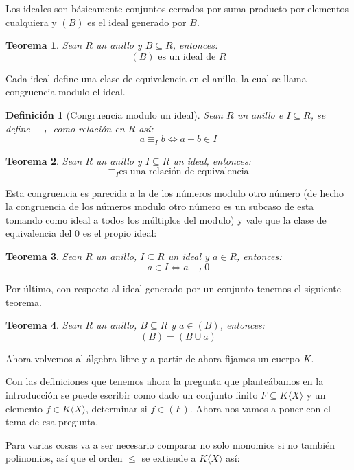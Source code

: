 \documentclass{report}
\theoremstyle{customstyle}
\newtheorem{definition}{Definición}[chapter]
\newtheorem{theorem}{Teorema}[chapter]
\theoremstyle{factstyle}
\begin{document}
Los ideales son básicamente conjuntos cerrados por suma producto por elementos cualquiera y $(B)$ es el ideal generado por $B$.

\begin{theorem}
  Sean $R$ un anillo y $B ⊆ R$, entonces:
  \[ (B)\text{ es un ideal de }R \]
\end{theorem}

Cada ideal define una clase de equivalencia en el anillo, la cual se llama congruencia modulo el ideal.

\begin{definition}[Congruencia modulo un ideal]\label{def:congruencia mod ideal}
  Sean $R$ un anillo e $I ⊆ R$, se define $≡_I$ como relación en $R$ así:
  \[ a ≡_I b ⇔ a - b ∈ I \]
\end{definition}

\begin{theorem}\label{thm:congruencia mod ideal es equivalencia}
  Sean $R$ un anillo y $I ⊆ R$ un ideal, entonces:
  \[ ≡_I \text{es una relación de equivalencia} \]
\end{theorem}

Esta congruencia es parecida a la de los números modulo otro número (de hecho la congruencia de los números modulo otro número es un subcaso de esta tomando como ideal a todos los múltiplos del modulo) y vale que la clase de equivalencia del $0$ es el propio ideal:

\begin{theorem}\label{thm:en ideal ⇔ congruente 0}
Sean $R$ un anillo, $I ⊆ R$ un ideal y $a ∈ R$, entonces:
\[ a ∈ I ⇔ a ≡_I 0 \]
\end{theorem}

Por último, con respecto al ideal generado por un conjunto tenemos el siguiente teorema.

\begin{theorem}\label{thm:gen B = gen B U a con a ∈ gen B}
  Sean $R$ un anillo, $B ⊆ R$ y $a ∈ (B)$, entonces:
  \[ (B) = (B ∪ {a}) \]
\end{theorem}

Ahora volvemos al álgebra libre y a partir de ahora fijamos un cuerpo $K$.

Con las definiciones que tenemos ahora la pregunta que planteábamos en la introducción se puede escribir como dado un conjunto finito $F ⊆ K⟨X⟩$ y un elemento $f ∈ K⟨X⟩$, determinar si $f ∈ (F)$. Ahora nos vamos a poner con el tema de esa pregunta.

Para varias cosas va a ser necesario comparar no solo monomios si no también polinomios, así que el orden $≤$ se extiende a $K⟨X⟩$ así:
\end{document}
